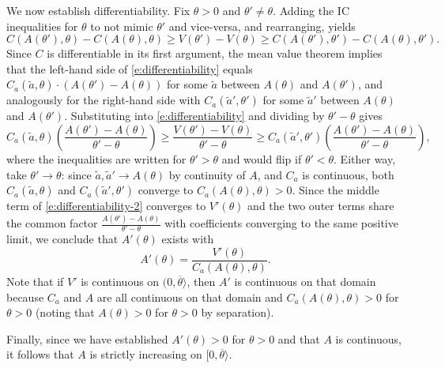 \documentclass[12 pt]{article}
\makeatletter
\newenvironment{proof}[1][Proof]{\noindent\textbf{#1} }{\ \rule{0.5em}{0.5em}}
\theoremstyle{remark}
\theoremstyle{definition}
\def\typemin{0}
\def\typemax{\overline \theta}
\renewenvironment{proof}[1][\proofname] {\par\pushQED{\qed}\normalfont\topsep6\p@\@plus6\p@\relax\trivlist\item[\hskip\labelsep\bfseries#1\@addpunct{.}]\ignorespaces}{\popQED\endtrivlist\@endpefalse}
\makeatother
\begin{document}
\begin{proof}[Proof of \autoref{prop:separating-differentiable}]
We now establish differentiability. Fix $\theta > \typemin$ and $\theta' \neq \theta$. Adding the IC inequalities for $\theta$ to not mimic $\theta'$ and vice-versa, and rearranging, yields
\begin{equation}
\label{e:differentiability}
C(A(\theta'), \theta) - C(A(\theta), \theta) \geq V(\theta') - V(\theta) \geq C(A(\theta'), \theta') - C(A(\theta), \theta').
\end{equation}
Since $C$ is differentiable in its first argument, the mean value theorem implies that the left-hand side of \eqref{e:differentiability} equals $C_a(\tilde{a}, \theta) \cdot (A(\theta') - A(\theta))$ for some $\tilde{a}$ between $A(\theta)$ and $A(\theta')$, and analogously for the right-hand side with $C_a(\tilde{a}', \theta')$ for some $\tilde{a}'$ between $A(\theta)$ and $A(\theta')$. Substituting into \eqref{e:differentiability} and dividing by $\theta' - \theta$ gives
\begin{equation}
\label{e:differentiability-2}
C_a(\tilde{a}, \theta) \left( \frac{A(\theta') - A(\theta)}{\theta' - \theta}\right) \geq \frac{V(\theta') - V(\theta)}{\theta' - \theta} \geq C_a(\tilde{a}', \theta') \left(\frac{A(\theta') - A(\theta)}{\theta' - \theta}\right),    
\end{equation}
where the inequalities are written for $\theta'>\theta$ and would flip if $\theta' < \theta$. Either way, take $\theta' \to \theta$: since $\tilde{a}, \tilde{a}' \to A(\theta)$ by continuity of $A$, and $C_a$ is continuous, both $C_a(\tilde{a}, \theta)$ and $C_a(\tilde{a}', \theta')$ converge to $C_a(A(\theta), \theta) > 0$. Since the middle term of \eqref{e:differentiability-2} converges to $V'(\theta)$ and the two outer terms share the common factor $\frac{A(\theta') - A(\theta)}{\theta' - \theta}$ with coefficients converging to the same positive limit, we conclude that $A'(\theta)$ exists with
\[
A'(\theta) = \frac{V'(\theta)}{C_a(A(\theta), \theta)}.
\]
Note that if $V'$ is continuous on $(\typemin,\typemax\rangle$, then $A'$ is continuous on that domain because $C_a$ and $A$ are all continuous on that domain and $C_a(A(\theta), \theta) > 0$ for $\theta>0$ (noting that $A(\theta)>0$ for $\theta>\typemin$ by separation).

Finally, since we have established $A'(\theta)> 0$ for $\theta>0$ and that $A$ is continuous, it follows that $A$ is strictly increasing on $[\typemin, \typemax\rangle$.
\end{proof}
\end{document}

